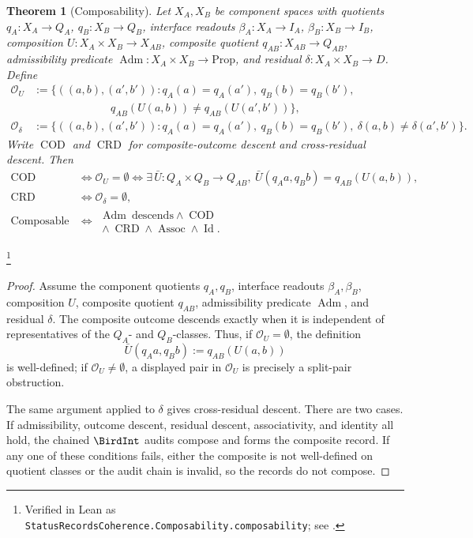 \documentclass[11pt]{article}
\newtheorem{theorem}{Theorem}[section]
\theoremstyle{definition}
\begin{document}
\begin{theorem}[Composability]\label{thm:F28}
Let \(X_A,X_B\) be component spaces with quotients
\(q_A:X_A\to Q_A\), \(q_B:X_B\to Q_B\), interface readouts
\(\beta_A:X_A\to I_A\), \(\beta_B:X_B\to I_B\), composition
\(U:X_A\times X_B\to X_{AB}\), composite quotient
\(q_{AB}:X_{AB}\to Q_{AB}\), admissibility predicate
\(\operatorname{Adm}:X_A\times X_B\to\mathrm{Prop}\), and residual
\(\delta:X_A\times X_B\to D\).  Define
\begin{align*}
  \mathcal O_U
  &:=
  \{((a,b),(a',b')) :
     q_A(a)=q_A(a'),\ q_B(b)=q_B(b'),\\
  &\hspace{7em}
     q_{AB}(U(a,b))\ne q_{AB}(U(a',b'))\},\\
  \mathcal O_{\delta}
  &:=
  \{((a,b),(a',b')) :
     q_A(a)=q_A(a'),\ q_B(b)=q_B(b'),\
     \delta(a,b)\ne\delta(a',b')\}.
\end{align*}
Write \(\operatorname{COD}\) and \(\operatorname{CRD}\) for
composite-outcome descent and cross-residual descent.  Then
\begin{align*}
  \operatorname{COD}
  &\iff
  \mathcal O_U=\emptyset
  \iff
  \exists\,\bar U:Q_A\times Q_B\to Q_{AB},\
    \bar U(q_Aa,q_Bb)=q_{AB}(U(a,b)),\\
  \operatorname{CRD}
  &\iff
  \mathcal O_{\delta}=\emptyset,\\
  \operatorname{Composable}
  &\iff
  \begin{gathered}
    \operatorname{Adm}\ \text{descends}\wedge
    \operatorname{COD}\\
    {}\wedge\operatorname{CRD}
    \wedge\operatorname{Assoc}\wedge\operatorname{Id}.
  \end{gathered}
\end{align*}
\end{theorem}
\footnote{\raggedright Verified in Lean as
\texttt{StatusRecordsCoherence.Composability.composability}; see
\Cref{app:formalization}.}
\begin{proof}
Assume the component quotients \(q_A,q_B\), interface readouts
\(\beta_A,\beta_B\), composition \(U\), composite quotient
\(q_{AB}\), admissibility predicate \(\operatorname{Adm}\), and
residual \(\delta\).  The composite outcome descends exactly when it
is independent of representatives of the \(Q_A\)- and \(Q_B\)-classes.
Thus, if \(\mathcal O_U=\emptyset\), the definition
\[
  \bar U(q_Aa,q_Bb):=q_{AB}(U(a,b))
\]
is well-defined; if \(\mathcal O_U\ne\emptyset\), a displayed pair in
\(\mathcal O_U\) is precisely a split-pair obstruction.

The same argument applied to \(\delta\) gives cross-residual descent.
There are two cases.  If admissibility, outcome descent, residual
descent, associativity, and identity all hold, the chained
\(\BirdInt\) audits compose and \Cref{thm:F20} forms the composite
record.  If any one of these conditions fails, either the composite is
not well-defined on quotient classes or the audit chain is invalid, so
the records do not compose.
\end{proof}
\end{document}
